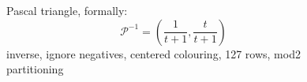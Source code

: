 
\begin{figure}[p]

    \noindent{}

    \captionsetup{singlelinecheck=off}
    \caption[$\mathcal{P}_{\equiv_{2}}^{-1}$, ignore negative entries]{
        Pascal triangle, formally: 
        \begin{displaymath}
            \mathcal{P}^{-1}=\left(\frac{1}{t + 1}, \frac{t}{t + 1}\right)
        \end{displaymath} %
        inverse, ignore negatives, centered colouring, 127 rows, mod2 partitioning}

    \label{fig:pascal-inverse-ignore-negatives-centered-colouring-127-rows-mod2-partitioning-triangle}

\end{figure}
